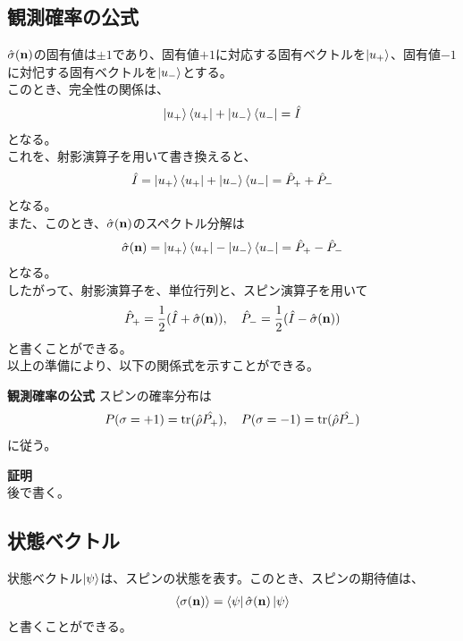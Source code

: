 \documentclass[a4paper,11pt]{jsarticle}
\begin{document}
\subsection{観測確率の公式}
$\hat{\sigma}(\vb n)$の固有値は$\pm 1$であり、固有値$+1$に対応する固有ベクトルを$\ket{u_+}$、固有値$-1$に対忋する固有ベクトルを$\ket{u_-}$とする。\\
このとき、完全性の関係は、
\begin{align}
    \ket{u_+}\bra{u_+} + \ket{u_-}\bra{u_-} = \hat I
\end{align}
となる。\\
これを、射影演算子を用いて書き換えると、
\begin{align}
    \hat I = \ket{u_+}\bra{u_+} + \ket{u_-}\bra{u_-}=\hat{P}_+ + \hat{P}_-
\end{align}
となる。\\
また、このとき、$\hat{\sigma}(\vb n)$のスペクトル分解は
\begin{align}
    \hat{\sigma}(\vb n) = \ket{u_+}\bra{u_+} - \ket{u_-}\bra{u_-}=\hat{P}_+ - \hat{P}_-
\end{align}
となる。\\
したがって、射影演算子を、単位行列と、スピン演算子を用いて
\begin{align}
    \hat{P}_+ = \frac{1}{2}(\hat I + \hat{\sigma}(\vb n)), \quad \hat{P}_- = \frac{1}{2}(\hat I - \hat{\sigma}(\vb n))
\end{align}
と書くことができる。\\
以上の準備により、以下の関係式を示すことができる。
\begin{itembox}[l]{\textbf{観測確率の公式}}
    スピンの確率分布は
    \begin{align}
        P(\sigma = +1) = \trace(\hat{\rho}\hat{P_+}), \quad P(\sigma = -1) = \trace(\hat{\rho}\hat{P_-})
    \end{align}
    に従う。
\end{itembox}
\textbf{証明}\\
後で書く。\\%

\subsection{状態ベクトル}
状態ベクトル$\ket{\psi}$は、スピンの状態を表す。このとき、スピンの期待値は、
\begin{align}
    \ev{\sigma(\vb n)} = \bra{\psi}\hat{\sigma}(\vb n)\ket{\psi}
\end{align}
と書くことができる。\\
\end{document}
